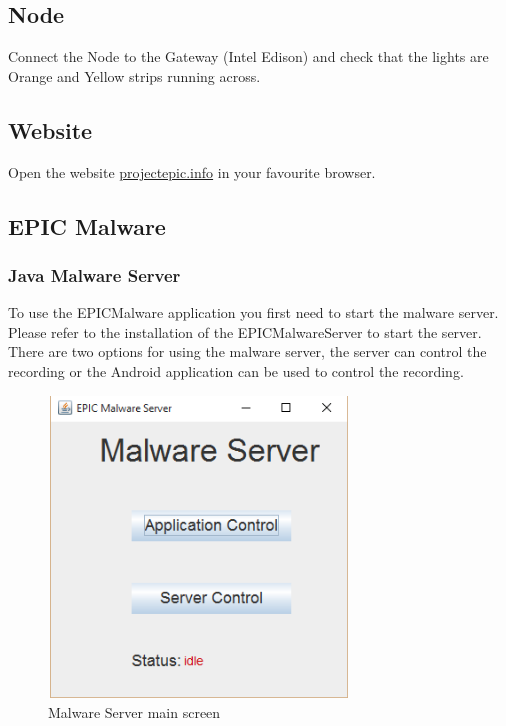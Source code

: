\documentclass{article}
\begin{document}
\subsection{Node}
Connect the Node to the Gateway (Intel Edison) and check that the lights are Orange and Yellow strips running across.

\subsection{Website}
Open the website \url{projectepic.info} in your favourite browser.

\subsection{EPIC Malware}
\subsubsection{Java Malware Server}
To use the EPICMalware application you first need to start the malware server.
Please refer to the installation of the EPICMalwareServer to start the server.
There are two options for using the malware server, the server can control the recording or the Android application can be used to control the recording. 
\begin{figure}[H]
\center
\includegraphics[width=8cm, height=8cm]{MalwareScreenshots/AppStart}
\caption{Malware Server main screen}
\label{fig:my_label5}
\end{figure}
\end{document}
